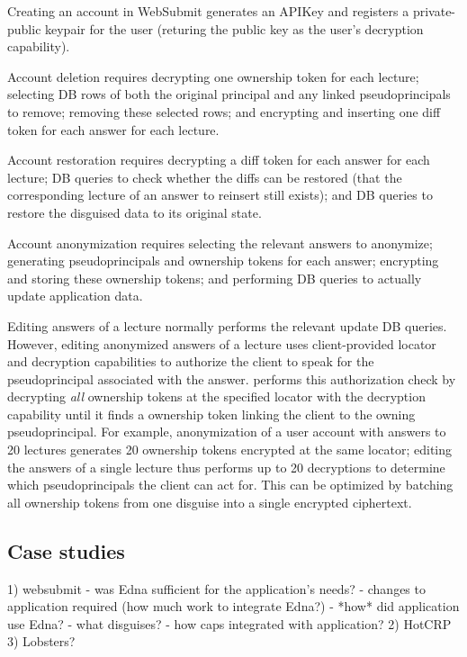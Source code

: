 Creating an account in WebSubmit generates an APIKey and registers a private-public keypair
for the user (returing the public key as the user's decryption capability).

Account deletion requires decrypting one ownership token for each lecture; selecting DB rows of
both the original principal and any linked pseudoprincipals to remove; removing these
selected rows; and encrypting and inserting one diff token for each answer for each lecture.

Account restoration requires decrypting a diff token for each answer for each lecture; DB queries to check
whether the diffs can be restored (\eg that the corresponding lecture of an answer to reinsert
still exists); and DB queries to restore the disguised data to its original state.

Account anonymization requires selecting the relevant answers to anonymize; generating
pseudoprincipals and ownership tokens for each answer; encrypting and storing these ownership tokens; and performing DB queries to actually update application data.

Editing answers of a lecture normally performs the relevant update DB queries. However, editing
anonymized answers of a lecture uses client-provided locator and decryption capabilities to
authorize the client to speak for the pseudoprincipal associated with the answer. \sys performs this
authorization check by decrypting \emph{all} ownership tokens at the specified locator with the
decryption capability until it finds a ownership token linking the client to the owning
pseudoprincipal. For example, anonymization of a user account with answers to 20 lectures generates
20 ownership tokens encrypted at the same locator; editing the answers of a single lecture thus
performs up to 20 decryptions to determine which pseudoprincipals the client can act for. This can
be optimized by batching all ownership tokens from one disguise into a single encrypted ciphertext.


\subsection{Case studies}
   1) websubmit
      - was Edna sufficient for the application's needs?
      - changes to application required (how much work to integrate Edna?)
      - *how* did application use Edna?
        - what disguises?
        - how caps integrated with application?
   2) HotCRP
   3) Lobsters?

